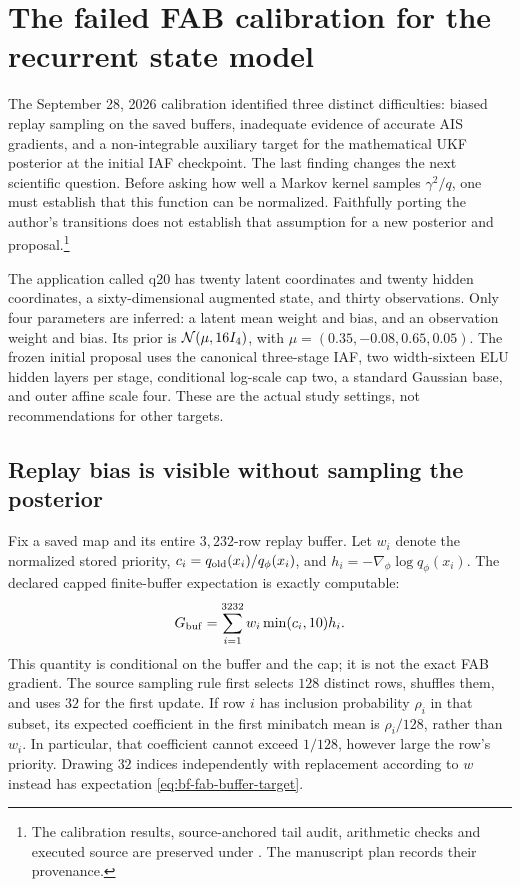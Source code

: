 \section[The q20 FAB calibration]{The failed FAB calibration for the recurrent state model}
\label{sec:bf-fab-q20-failure}

The September 28, 2026 calibration identified three distinct difficulties:
biased replay sampling on the saved buffers, inadequate evidence of accurate
AIS gradients, and a non-integrable auxiliary target for the mathematical UKF
posterior at the initial IAF checkpoint. The last finding changes the next
scientific question. Before asking how well a Markov kernel samples
$\gamma^2/q$, one must establish that this function can be normalized.
Faithfully porting the author's transitions does not establish that assumption
for a new posterior and proposal.\footnote{\raggedright
\def\UrlBreaks{\do\/\do\-}
The calibration results, source-anchored tail audit, arithmetic checks and
executed source are preserved under
.
The manuscript plan
records their provenance.\par}

The application called q20 has twenty latent coordinates and twenty hidden
coordinates, a sixty-dimensional augmented state, and thirty observations.
Only four parameters are inferred: a latent mean weight and bias, and an
observation weight and bias. Its prior is $\mathcal{N}(\mu,16I_4)$, with
$\mu=(0.35,-0.08,0.65,0.05)$. The frozen initial proposal uses the canonical
three-stage IAF, two width-sixteen ELU hidden layers per stage, conditional
log-scale cap two, a standard Gaussian base, and outer affine scale four.
These are the actual study settings, not recommendations for other targets.

\subsection{Replay bias is visible without sampling the posterior}

Fix a saved map and its entire $3{,}232$-row replay buffer. Let $w_i$ denote
the normalized stored priority, $c_i=q_{\rm old}(x_i)/q_\phi(x_i)$, and
$h_i=-\nabla_\phi\log q_\phi(x_i)$. The declared capped finite-buffer
expectation is exactly computable:
\begin{equation}
 G_{\rm buf}=\sum_{i=1}^{3232}w_i\min(c_i,10)h_i.
 \label{eq:bf-fab-buffer-target}
\end{equation}
This quantity is conditional on the buffer and the cap; it is not the exact
FAB gradient. The source sampling rule first selects $128$ distinct rows,
shuffles them, and uses $32$ for the first update. If row $i$ has inclusion
probability $\rho_i$ in that subset, its expected coefficient in the first
minibatch mean is $\rho_i/128$, rather than $w_i$. In particular, that
coefficient cannot exceed $1/128$, however large the row's priority. Drawing
$32$ indices independently with replacement according to $w$ instead has
expectation \eqref{eq:bf-fab-buffer-target}.

